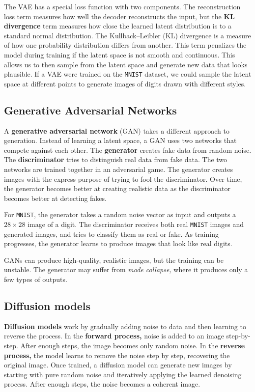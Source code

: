 The VAE has a special loss function with two components. The reconstruction loss term measures how well the decoder reconstructs the input, but the \textbf{KL divergence} term measures how close the learned latent distribution is to a standard normal distribution. The Kullback–Leibler (KL) divergence is a measure of how one probability distribution differs from another. This term penalizes the model during training if the latent space is not smooth and continuous. This allows us to then sample from the latent space and generate new data that looks plausible. If a VAE were trained on the \texttt{MNIST} dataset, we could sample the latent space at different points to generate images of digits drawn with different styles.

\subsection*{Generative Adversarial Networks}
A \textbf{generative adversarial network} (GAN) takes a different approach to generation. Instead of learning a latent space, a GAN uses two networks that compete against each other. The \textbf{generator} creates fake data from random noise. The \textbf{discriminator} tries to distinguish real data from fake data. The two networks are trained together in an adversarial game. The generator creates images with the express purpose of trying to fool the discriminator. Over time, the generator becomes better at creating realistic data as the discriminator becomes better at detecting fakes.

For \texttt{MNIST}, the generator takes a random noise vector as input and outputs a $28 \times 28$ image of a digit. The discriminator receives both real \texttt{MNIST} images and generated images, and tries to classify them as real or fake. As training progresses, the generator learns to produce images that look like real digits.

GANs can produce high-quality, realistic images, but the training can be unstable. The generator may suffer from \textit{mode collapse,} where it produces only a few types of outputs.

\subsection*{Diffusion models}
\textbf{Diffusion models} work by gradually adding noise to data and then learning to reverse the process. In the \textbf{forward process,} noise is added to an image step-by-step. After enough steps, the image becomes only random noise. In the \textbf{reverse process,} the model learns to remove the noise step by step, recovering the original image. Once trained, a diffusion model can generate new images by starting with pure random noise and iteratively applying the learned denoising process. After enough steps, the noise becomes a coherent image.

